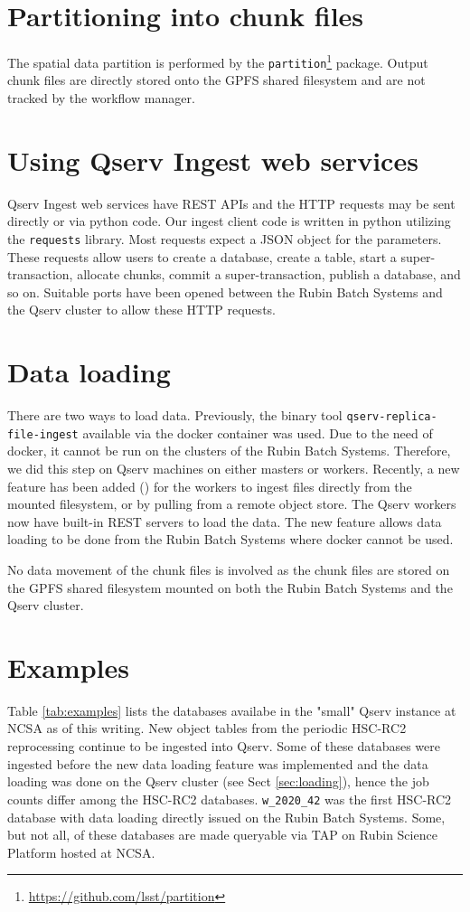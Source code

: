 \section{Partitioning into chunk files}
The spatial data partition is performed by the \texttt{partition}\footnote{\url{https://github.com/lsst/partition}} package.
Output chunk files are directly stored onto the GPFS shared filesystem and are not tracked by the workflow manager.


\section{Using Qserv Ingest web services}
Qserv Ingest web services have REST APIs and the HTTP requests may be sent directly or via python code.
Our ingest client code is written in python utilizing the \texttt{requests} library.
Most requests expect a JSON object for the parameters.
These requests allow users to create a database, create a table, start a super-transaction, allocate chunks, commit a super-transaction, publish a database, and so on.
Suitable ports have been opened between the Rubin Batch Systems and the Qserv cluster to allow these HTTP requests.


\label{sec:loading}
\section{Data loading}
There are two ways to load data.
Previously, the binary tool \texttt{qserv-replica-file-ingest} available via the docker container was used. Due to the need of docker, it cannot be run on the clusters of the Rubin Batch Systems. Therefore, we did this step on Qserv machines on either masters or workers.
Recently, a new feature has been added () for the workers to ingest files directly from the mounted filesystem, or by pulling from a remote object store. The Qserv workers now have built-in REST servers to load the data.  The new feature allows data loading to be done from the Rubin Batch Systems where docker cannot be used.

No data movement of the chunk files is involved as the chunk files are stored on the GPFS shared filesystem mounted on both the Rubin Batch Systems and the Qserv cluster.

\section{Examples}
Table \ref{tab:examples} lists the databases availabe in the "small" Qserv instance at NCSA as of this writing.
New object tables from the periodic HSC-RC2 reprocessing continue to be ingested into Qserv.
Some of these databases were ingested before the new data loading feature was implemented and the data loading was done on the Qserv cluster (see Sect \ref{sec:loading}), hence the job counts differ among the HSC-RC2 databases.
\texttt{w\_2020\_42} was the first HSC-RC2 database with data loading directly issued on the Rubin Batch Systems.
Some, but not all, of these databases are made queryable via TAP on Rubin Science Platform hosted at NCSA.


